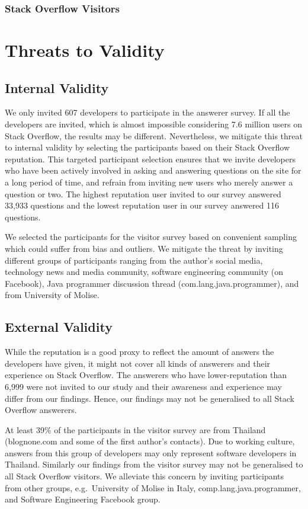 \documentclass{svjour3}                     %
\begin{document}
\subsubsection{Stack Overflow Visitors}

\section{Threats to Validity}

\subsection{Internal Validity}
We only invited 607
developers to participate in the answerer survey. If all the developers are
invited, which is almost impossible considering 7.6 million users on Stack
Overflow, the results may be different. Nevertheless, we mitigate this threat to
internal validity by selecting the participants based on their Stack Overflow
reputation. This targeted participant selection ensures that we
invite developers who have been actively involved in asking and answering
questions on the site for a long period of time, and refrain from inviting new
users who merely answer a question or two. The highest reputation user invited
to our survey answered 33,933 questions and the lowest reputation user in our
survey answered 116 questions.

We selected the participants for the visitor survey based on convenient sampling
which could suffer from bias and outliers. We mitigate the threat by inviting
different groups of participants ranging from the author's social media,
technology news and media community, software engineering community (on
Facebook), Java programmer discussion thread (com.lang.java.programmer), and
from University of Molise.


\subsection{External Validity} 
While the reputation is a good proxy to reflect the amount of answers the
developers have given, it might not cover all kinds of answerers and their
experience on Stack Overflow. The answerers who have lower-reputation than 6,999
were not invited to our study and their awareness and experience may differ from
our findings. Hence, our findings may not be generalised to all Stack Overflow
answerers.

At least 39\% of the participants in the visitor survey are from Thailand
(\textsf{blognone.com} and some of the first author's contacts). Due to working
culture, answers from this group of developers may only represent software
developers in Thailand. Similarly our findings from the visitor survey may not
be generalised to all Stack Overflow visitors. We alleviate this concern by
inviting participants from other groups, e.g.~University of Molise in Italy,
comp.lang.java.programmer, and Software Engineering Facebook group.
\end{document}
